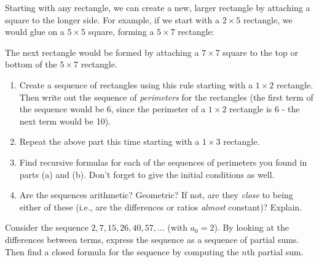 \documentclass[11pt,]{book}
\theoremstyle{ptxplainnotitle}
\theoremstyle{ptxplaintitle}
\theoremstyle{ptxdefinitionnotitle}
\theoremstyle{ptxdefinitiontitle}
\theoremstyle{ptxdefinitionnotitle}
\theoremstyle{ptxdefinitiontitle}
\theoremstyle{ptxdefinitionnotitle}
\theoremstyle{ptxdefinitiontitle}
\theoremstyle{ptxdefinitiontitlenonumber}
\theoremstyle{ptxdefinitiontitlenonumber}
\numberwithin{equation}{chapter}
\begin{document}
\begin{divisionexercise}{11}\hypertarget{exercise-23}{}
\hypertarget{p-329}{}%
Starting with any rectangle, we can create a new, larger rectangle by attaching a square to the longer side. For example, if we start with a \(2\times 5\) rectangle, we would glue on a \(5\times 5\) square, forming a \(5 \times 7\) rectangle:%
\begin{sidebyside}{1}{0.2}{0.2}{0}
\begin{sbspanel}{0.6}
\end{sbspanel}
\end{sidebyside}
\par
\hypertarget{p-330}{}%
The next rectangle would be formed by attaching a \(7 \times 7\) square to the top or bottom of the \(5\times 7\) rectangle.  \leavevmode%
\begin{enumerate}[label=(\alph*)]
\item\hypertarget{li-171}{}\hypertarget{p-331}{}%
Create a sequence of rectangles using this rule starting with a \(1\times 2\) rectangle. Then write out the sequence of \emph{perimeters} for the rectangles (the first term of the sequence would be 6, since the perimeter of a \(1\times 2\) rectangle is 6 - the next term would be 10). %
\item\hypertarget{li-172}{}\hypertarget{p-332}{}%
Repeat the above part this time starting with a \(1 \times 3\) rectangle. %
\item\hypertarget{li-173}{}\hypertarget{p-333}{}%
Find recursive formulas for each of the sequences of perimeters you found in parts (a) and (b). Don't forget to give the initial conditions as well. %
\item\hypertarget{li-174}{}\hypertarget{p-334}{}%
Are the sequences arithmetic? Geometric? If not, are they \emph{close} to being either of these (i.e., are the differences or ratios \emph{almost} constant)? Explain. %
\end{enumerate}
%
\end{divisionexercise}%
\begin{divisionexercise}{12}\hypertarget{exercise-24}{}
\hypertarget{p-335}{}%
Consider the sequence \(2, 7, 15, 26, 40, 57, \ldots\) (with \(a_0 = 2\)). By looking at the differences between terms, express the sequence as a sequence of partial sums. Then find a closed formula for the sequence by computing the \(n\)th partial sum.%
\end{divisionexercise}%
\end{document}
